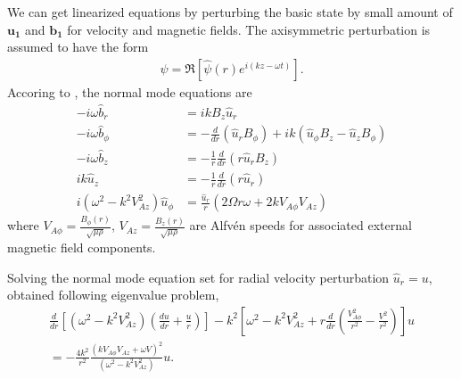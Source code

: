 \documentclass{jfm}
\newcommand{\del}{\nabla}
\begin{document}
We can get linearized equations by perturbing the basic state by small amount of $\mathbf{u_1}$ and $\mathbf{b_1}$ for velocity and magnetic fields.
The axisymmetric perturbation is assumed to have the form
\begin{align}
    \psi=\Re\left[\hat{\psi}(r)e^{i(kz-\omega t)} \right].
    \end{align}
    Accoring to \cite{Acheson1972}, the normal mode equations are
    \begin{align}
    -i\omega\hat{b}_r&= ikB_z \hat{u}_r\\
    -i\omega\hat{b}_\phi &= -\frac{d}{dr}(\hat{u}_r B_\phi) +ik(\hat{u}_\phi B_z -\hat{u}_z B_\phi)\\
    -i\omega \hat{b}_z &= -\frac{1}{r}\frac{d}{dr} (r\hat{u}_r B_z)\\
    ik\hat{u}_z &= -\frac{1}{r}\frac{d}{dr}(r \hat{u}_r)\\
    i{(\omega^2-k^2 V_{Az}^2)}\hat{u}_\phi &= \frac{\hat{u}_r}{r}(2\Omega r \omega +2k V_{A\phi}V_{Az})
\end{align}
where $V_{A\phi}=\frac{B_\phi (r)}{\sqrt{\mu\rho}}$, $V_{Az}=\frac{B_z (r)}{\sqrt{\mu\rho}}$ are Alfv\'en speeds for associated external magnetic field components.

Solving the normal mode equation set for radial velocity perturbation $\hat{u}_r = u$, \cite{Acheson1973a} obtained following eigenvalue problem,
\begin{align}
\frac{d}{dr}\left[(\omega^2-k^2 V_{Az}^2)\left(\frac{du}{dr}+\frac{u}{r}\right)\right]-k^2\left[\omega^2-k^2 V_{Az}^2+r\frac{d}{dr}\left(\frac{V_{A\phi}^2}{r^2}-\frac{V^2}{r^2}\right)\right]u \nonumber \\
= -\frac{4 k^2}{r^2}\frac{(k V_{A\phi} V_{Az}+\omega V)^2}{(\omega^2-k^2 V_{Az}^2)} u.
\end{align}
\end{document}
